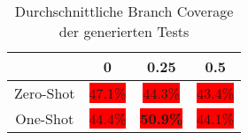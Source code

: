 \bgroup
\def\arraystretch{2}
\begin{table}[H]
	\vspace{.5cm}
	\centering		
	\begin{center}
		\begin{tabular}{|c||c|c|c|}
			\hline 
			& 0 & 0.25 & 0.5 \\
			\hline 
			\hline
			Zero-Shot & \colorbox{red}{47.1\%} & \colorbox{red}{44.3\%} & \colorbox{red}{43.4\%} \\
			\hline
			One-Shot & \colorbox{red}{44.4\%} & \colorbox{red}{\textbf{50.9\%}} & \colorbox{red}{44.1\%} \\
			\hline
		\end{tabular} 
	\end{center}
	\caption{Durchschnittliche Branch Coverage der generierten Tests}
	\label{fig:branch-avg}
	\vspace{-.8cm}
\end{table}
\egroup